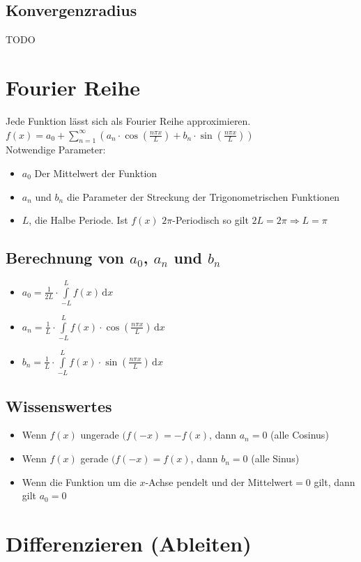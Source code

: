 \documentclass[a4paper,portrait]{scrartcl}
\begin{document}
\subsection{Konvergenzradius}
TODO
\clearpage
\section{Fourier Reihe}
Jede Funktion lässt sich als Fourier Reihe approximieren.\\
$f(x) = a_0 + \sum\limits_{n=1}^{\infty}(a_n\cdot \cos (\frac{n\pi x}{L})+b_n\cdot \sin (\frac{n\pi x}{L}))$ \\
Notwendige Parameter:
\begin{itemize}
  \item $a_0$ Der Mittelwert der Funktion
  \item $a_n$ und $b_n$ die Parameter der Streckung der Trigonometrischen Funktionen
  \item $L$, die Halbe Periode. Ist $f(x)$ $2\pi$-Periodisch so gilt $2L = 2\pi \Rightarrow L=\pi$
\end{itemize}

\subsection{Berechnung von $a_0$, $a_n$ und $b_n$}
\begin{itemize}
  \item $a_0 = \frac{1}{2L} \cdot \int\limits_{-L}^{L} \!f(x)  \, \mathrm{d}x$ 
  \item $a_n = \frac{1}{L} \cdot \int\limits_{-L}^{L} \! f(x) \cdot \cos (\frac{n\pi x}{L}) \, \mathrm{d}x$ 
  \item $b_n = \frac{1}{L} \cdot \int\limits_{-L}^{L} \! f(x) \cdot \sin (\frac{n\pi x}{L}) \, \mathrm{d}x$ 
\end{itemize}
\subsection{Wissenswertes}
\begin{itemize}
  \item Wenn $f(x)$ ungerade $(f(-x) = -f(x)$, dann $a_n = 0$ (alle Cosinus)
  \item Wenn $f(x)$ gerade $(f(-x) = f(x)$, dann $b_n = 0$ (alle Sinus)
  \item Wenn die Funktion um die $x$-Achse pendelt und der Mittelwert$=0$ gilt, dann gilt $a_0=0$
\end{itemize}
\section{Differenzieren (Ableiten)}
\end{document}
